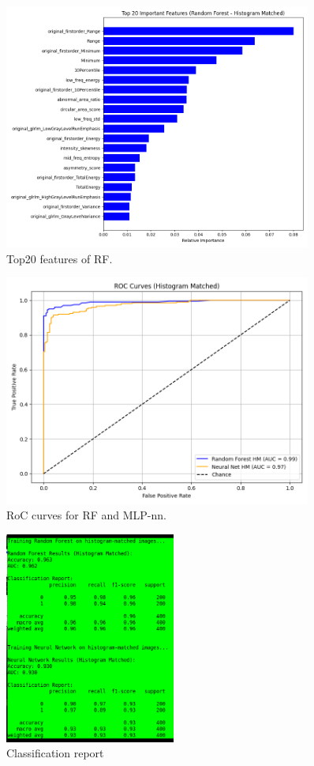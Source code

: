 \documentclass[11pt,a4paper]{article}
\begin{document}
		\begin{figure}[H]
			\centering
			\includegraphics[width=0.9\textwidth]{images/top20_rf_hm.png}
			\caption{Top20 features of RF.}
			\label{fig1:}
		\end{figure}		

		\begin{figure}[H]
			\centering
			\includegraphics[width=0.9\textwidth]{images/roc_hm.png}
			\caption{RoC curves for RF and MLP-nn.}
			\label{fig1:}
		\end{figure}		

		\begin{figure}[H]
			\centering
			\includegraphics[width=0.5\textwidth]{images/report_hm.png}
			\caption{Classification report}
			\label{fig1:}
		\end{figure}		
\end{document}
